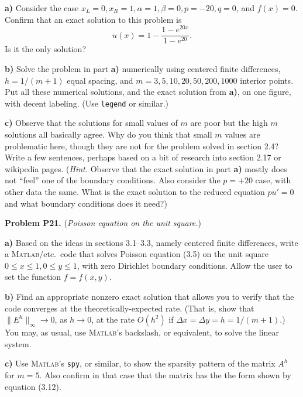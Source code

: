 \documentclass[12pt]{amsart}
\newcommand{\Matlab}{\textsc{Matlab}\xspace}
\newcommand{\prob}[1]{\bigskip\noindent\textbf{#1}\quad }
\newcommand{\epart}[1]{\medskip\noindent\textbf{#1)}\quad }
\begin{document}
\epart{a}  Consider the case $x_L=0,x_R=1,\alpha=1,\beta=0,p=-20,q=0$, and $f(x)=0$.  Confirm that an exact solution to this problem is
    $$u(x) = 1 - \frac{1 - e^{20x}}{1-e^{20}}.$$
Is it the only solution?

\epart{b}  Solve the problem in part \textbf{a)} numerically using centered finite differences, $h=1/(m+1)$ equal spacing, and $m=3,5,10,20,50,200,1000$ interior points.  Put all these numerical solutions, and the exact solution from \textbf{a)}, on one figure, with decent labeling.  (Use \texttt{legend} or similar.)

\epart{c}  Observe that the solutions for small values of $m$ are poor but the high $m$ solutions all basically agree.  Why do you think that small $m$ values are problematic here, though they are not for the problem solved in section 2.4?   Write a few sentences, perhaps based on a bit of research into section 2.17 or wikipedia pages. (\emph{Hint.}  Observe that the exact solution in part \textbf{a)} mostly does not ``feel'' one of the boundary conditions.  Also consider the $p=+20$ case, with other data the same.  What is the exact solution to the reduced equation $pu'=0$ and what boundary conditions does it need?)


\prob{Problem P21.}  (\emph{Poisson equation on the unit square.})

\epart{a}  Based on the ideas in sections 3.1--3.3, namely centered finite differences, write a \Matlab/etc.~code that solves Poisson equation (3.5) on the unit square $0\le x \le 1, 0 \le y \le 1$, with zero Dirichlet boundary conditions.  Allow the user to set the function $f=f(x,y)$.

\epart{b}  Find an appropriate nonzero exact solution that allows you to verify that the code converges at the theoretically-expected rate.  (That is, show that $\|E^h\|_\infty \to 0$, as $h\to 0$, at the rate $O(h^2)$ if $\Delta x = \Delta y = h = 1 / (m+1)$.)  You may, as usual, use \Matlab's backslash, or equivalent, to solve the linear system.

\epart{c}  Use \Matlab's \texttt{spy}, or similar, to show the sparsity pattern of the matrix $A^h$ for $m=5$.  Also confirm in that case that the matrix has the the form shown by equation (3.12).
\end{document}
